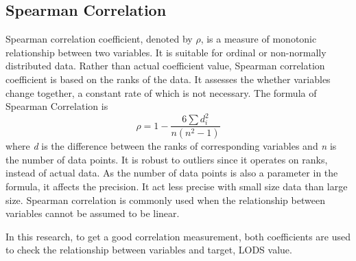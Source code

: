 \documentclass[12pt,a4paper,english
]{tunithesis}
\begin{document}
\subsection{Spearman Correlation}
Spearman correlation coefficient, denoted by \(\rho\), is a measure of monotonic relationship between two variables. It is suitable for ordinal or non-normally distributed data. Rather than actual coefficient value, Spearman correlation coefficient is based on the ranks of the data. It assesses the whether variables change together, a constant rate of which is not necessary. The formula of Spearman Correlation is
\begin{equation*}
    \rho = 1- {\frac {6 \sum d_i^2}{n(n^2 - 1)}}
\end{equation*}
where \textit{d} is the difference between the ranks of corresponding variables and \textit{n} is the number of data points. It is robust to outliers since it operates on ranks, instead of actual data. As the number of data points is also a parameter in the formula, it affects the precision. It act less precise with small size data than large size. Spearman correlation is commonly used when  the relationship between variables cannot be assumed to be linear.

In this research, to get a good correlation measurement, both coefficients are used to check the relationship between variables and target, LODS value.
\end{document}
